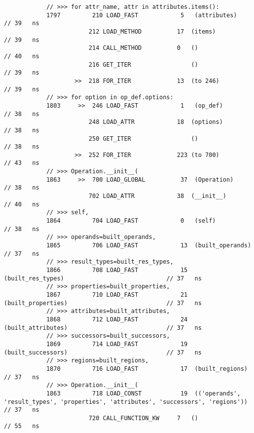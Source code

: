 \begin{code}
\begin{verbatim}
            // >>> for attr_name, attr in attributes.items():
            1797         210 LOAD_FAST            5   (attributes)                                  // 39   ns
                        212 LOAD_METHOD          17  (items)                                        // 39   ns
                        214 CALL_METHOD          0   ()                                             // 40   ns
                        216 GET_ITER                 ()                                             // 39   ns
                    >>  218 FOR_ITER             13  (to 246)                                       // 39   ns
            // >>> for option in op_def.options:
            1803     >>  246 LOAD_FAST            1   (op_def)                                      // 38   ns
                        248 LOAD_ATTR            18  (options)                                      // 38   ns
                        250 GET_ITER                 ()                                             // 38   ns
                    >>  252 FOR_ITER             223 (to 700)                                       // 43   ns
            // >>> Operation.__init__(
            1863     >>  700 LOAD_GLOBAL          37  (Operation)                                   // 38   ns
                        702 LOAD_ATTR            38  (__init__)                                     // 40   ns
            // >>> self,
            1864         704 LOAD_FAST            0   (self)                                        // 38   ns
            // >>> operands=built_operands,
            1865         706 LOAD_FAST            13  (built_operands)                              // 37   ns
            // >>> result_types=built_res_types,
            1866         708 LOAD_FAST            15  (built_res_types)                             // 37   ns
            // >>> properties=built_properties,
            1867         710 LOAD_FAST            21  (built_properties)                            // 37   ns
            // >>> attributes=built_attributes,
            1868         712 LOAD_FAST            24  (built_attributes)                            // 37   ns
            // >>> successors=built_successors,
            1869         714 LOAD_FAST            19  (built_successors)                            // 37   ns
            // >>> regions=built_regions,
            1870         716 LOAD_FAST            17  (built_regions)                               // 37   ns
            // >>> Operation.__init__(
            1863         718 LOAD_CONST           19  (('operands', 'result_types', 'properties', 'attributes', 'successors', 'regions'))  // 37   ns
                        720 CALL_FUNCTION_KW     7   ()                                             // 55   ns


\end{verbatim}
\end{code}
